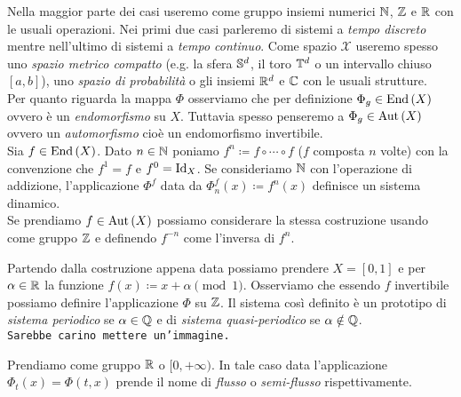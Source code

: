 Nella maggior parte dei casi useremo come gruppo insiemi numerici $ \N $, $ \Z $ e $ \R $ con le usuali operazioni. Nei primi due casi parleremo di sistemi a \emph{tempo discreto} mentre nell'ultimo di sistemi a \emph{tempo continuo}. Come spazio $ \mathcal{X} $ useremo spesso uno \emph{spazio metrico compatto} (e.g. la sfera $ \S^d $, il toro $ \T^d $ o un intervallo chiuso $ [a, b] $), uno \emph{spazio di probabilità} o gli insiemi $ \R^d $ e $ \C $ con le usuali strutture. \\

Per quanto riguarda la mappa $ \Phi $ osserviamo che per definizione $ \Phi_g \in \End{(X)} $ ovvero è un \emph{endomorfismo} su $ X $. Tuttavia spesso penseremo a $ \Phi_g \in \Aut{(X)} $ ovvero un \emph{automorfismo} cioè un endomorfismo invertibile. \\

Sia $ f \in \End{(X)} $. Dato $ n \in \N $ poniamo $ f^n \coloneqq f \circ \cdots \circ f $ ($ f $ composta $ n $ volte) con la convenzione che $ f^1 = f $ e $ f^0 = \Id_X $. Se consideriamo $ \N $ con l'operazione di addizione, l'applicazione $ \Phi^f $ data da $ \Phi_n^f(x) \coloneqq f^n(x) $ definisce un sistema dinamico. \\
Se prendiamo $ f \in \Aut{(X)} $ possiamo considerare la stessa costruzione usando come gruppo $ \Z $ e definendo $ f^{-n} $ come l'inversa di $ f^n $. 

\begin{example}
	Partendo dalla costruzione appena data possiamo prendere $ X = [0, 1] $ e per $ \alpha \in \R $ la funzione $ f(x) \coloneqq x + \alpha \pmod{1} $. Osserviamo che essendo $ f $ invertibile possiamo definire l'applicazione $ \Phi $ su $ \Z $. Il sistema così definito è un prototipo di \emph{sistema periodico} se $ \alpha \in \Q $ e di \emph{sistema quasi-periodico} se $ \alpha \notin \Q $. \\
	\texttt{Sarebbe carino mettere un'immagine.}
\end{example}

Prendiamo come gruppo $ \R $ o $ [0, +\infty) $. In tale caso data l'applicazione $ \Phi_t(x) = \Phi(t, x) $ prende il nome di \emph{flusso} o \emph{semi-flusso} rispettivamente. \\

